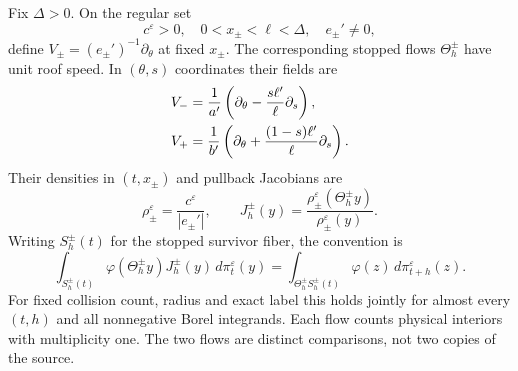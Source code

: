 \begin{theorem}
\label{thm:v103-gap-coarea}
Fix $\Delta>0$. On the regular set
\[
 c^\varepsilon>0,\quad 0<x_\pm<\ell<\Delta,\quad e_\pm'\ne0,
\]
define $V_\pm=(e_\pm')^{-1}\partial_\theta$ at fixed $x_\pm$.
The corresponding stopped flows $\Theta_h^\pm$ have unit roof speed.
In $(\theta,s)$ coordinates their fields are
\begin{align}
 V_-&=\frac1{a'}\left(\partial_\theta-
                    \frac{s\ell'}\ell\partial_s\right),\notag\\
 V_+&=\frac1{b'}\left(\partial_\theta+
                    \frac{(1-s)\ell'}\ell\partial_s\right).
                                                    \label{eq:v103-gap-fields}
\end{align}
Their densities in $(t,x_\pm)$ and pullback Jacobians are
\begin{equation}\label{eq:v103-gap-jacobian}
 \rho_\pm^\varepsilon=\frac{c^\varepsilon}{|e_\pm'|},
 \qquad J_h^\pm(y)=
       \frac{\rho_\pm^\varepsilon(\Theta_h^\pm y)}
            {\rho_\pm^\varepsilon(y)}.
\end{equation}
Writing $S_h^\pm(t)$ for the stopped survivor fiber, the convention is
\begin{equation}\label{eq:v103-gap-covariance}
 \int_{S_h^\pm(t)}\varphi(\Theta_h^\pm y)J_h^\pm(y)
                          \,d\pi_t^\varepsilon(y)
 =\int_{\Theta_h^\pm S_h^\pm(t)}\varphi(z)
                          \,d\pi_{t+h}^\varepsilon(z).
\end{equation}
For fixed collision count, radius and exact label this holds jointly
for almost every $(t,h)$ and all nonnegative Borel integrands.
Each flow counts physical interiors with multiplicity one. The two
flows are distinct comparisons, not two copies of the source.
\end{theorem}
